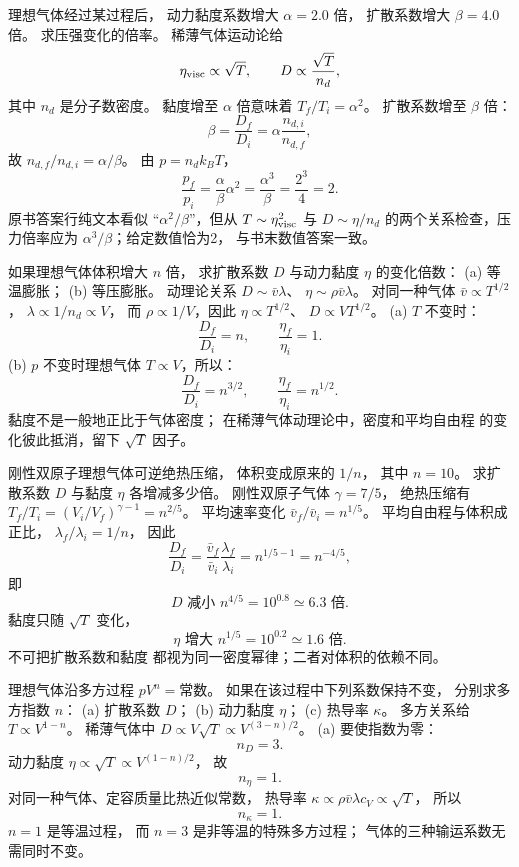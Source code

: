 理想气体经过某过程后，
动力黏度系数增大
$\alpha=2.0$ 倍，
扩散系数增大
$\beta=4.0$ 倍。
求压强变化的倍率。
\exsolution
稀薄气体运动论给
\[
\eta_{\rm visc}\propto\sqrt T,\qquad
D\propto\frac{\sqrt T}{n_d},
\]
其中 $n_d$ 是分子数密度。
黏度增至 $\alpha$ 倍意味着
$T_f/T_i=\alpha^2$。
扩散系数增至 $\beta$ 倍：
\[
\beta=\frac{D_f}{D_i}
=\alpha\frac{n_{d,i}}{n_{d,f}},
\]
故
$n_{d,f}/n_{d,i}=\alpha/\beta$。
由 $p=n_dk_BT$，
\[
\boxed{\frac{p_f}{p_i}
=\frac{\alpha}{\beta}\alpha^2
=\frac{\alpha^3}{\beta}
=\frac{2^3}{4}=2}.
\]
\excheck 原书答案行纯文本看似
“$\alpha^2/\beta$”，但从
$T\sim\eta_{\rm visc}^2$ 与 $D\sim\eta/n_d$
的两个关系检查，压力倍率应为
$\alpha^3/\beta$；给定数值恰为2，
与书末数值答案一致。

如果理想气体体积增大 $n$ 倍，
求扩散系数 $D$ 与动力黏度 $\eta$
的变化倍数：
(a) 等温膨胀；
(b) 等压膨胀。
\exsolution
动理论关系
$D\sim\bar v\lambda$、
$\eta\sim\rho\bar v\lambda$。
对同一种气体
$\bar v\propto T^{1/2}$，
$\lambda\propto1/n_d\propto V$，
而 $\rho\propto1/V$，因此
$\eta\propto T^{1/2}$、
$D\propto V T^{1/2}$。
(a) $T$ 不变时：
\[
\boxed{\frac{D_f}{D_i}=n,\qquad
\frac{\eta_f}{\eta_i}=1}.
\]
(b) $p$ 不变时理想气体
$T\propto V$，所以：
\[
\boxed{\frac{D_f}{D_i}=n^{3/2},\qquad
\frac{\eta_f}{\eta_i}=n^{1/2}}.
\]
\excheck 黏度不是一般地正比于气体密度；
在稀薄气体动理论中，密度和平均自由程
的变化彼此抵消，留下 $\sqrt T$ 因子。

刚性双原子理想气体可逆绝热压缩，
体积变成原来的 $1/n$，
其中 $n=10$。
求扩散系数 $D$ 与黏度 $\eta$
各增减多少倍。
\exsolution
刚性双原子气体
$\gamma=7/5$，
绝热压缩有
$T_f/T_i=(V_i/V_f)^{\gamma-1}
=n^{2/5}$。
平均速率变化
$\bar v_f/\bar v_i=n^{1/5}$。
平均自由程与体积成正比，
$\lambda_f/\lambda_i=1/n$，
因此
\[
\frac{D_f}{D_i}
=\frac{\bar v_f}{\bar v_i}
\frac{\lambda_f}{\lambda_i}
=n^{1/5-1}=n^{-4/5},
\]
即
\[
\boxed{D\text{ 减小 }n^{4/5}=10^{0.8}
\simeq6.3\text{ 倍}}.
\]
黏度只随 $\sqrt T$ 变化，
\[
\boxed{\eta\text{ 增大 }n^{1/5}
=10^{0.2}\simeq1.6\text{ 倍}}.
\]
\excheck 不可把扩散系数和黏度
都视为同一密度幂律；二者对体积的依赖不同。

理想气体沿多方过程
$pV^n=\text{常数}$。
如果在该过程中下列系数保持不变，
分别求多方指数 $n$：
(a) 扩散系数 $D$；
(b) 动力黏度 $\eta$；
(c) 热导率 $\kappa$。
\exsolution
多方关系给
$T\propto V^{1-n}$。
稀薄气体中
$D\propto V\sqrt T
\propto V^{(3-n)/2}$。
(a) 要使指数为零：
\[
\boxed{n_D=3}.
\]
动力黏度
$\eta\propto\sqrt T
\propto V^{(1-n)/2}$，
故
\[
\boxed{n_\eta=1}.
\]
对同一种气体、定容质量比热近似常数，
热导率
$\kappa\propto\rho\bar v\lambda c_V
\propto\sqrt T$，
所以
\[
\boxed{n_\kappa=1}.
\]
\excheck $n=1$ 是等温过程，
而 $n=3$ 是非等温的特殊多方过程；
气体的三种输运系数无需同时不变。
